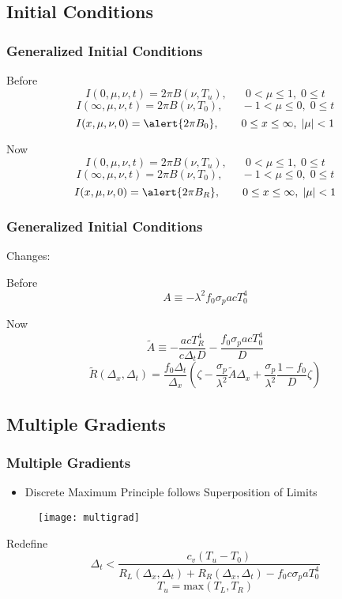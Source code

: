\documentclass{beamer}
\begin{document}
\subsection{Initial Conditions}
\begin{frame}\frametitle{Generalized Initial Conditions}
\begin{block}{Before}
\[I(0,\mu,\nu,t)=2\pi B(\nu,T_u),\hspace{20pt}0<\mu\leq1,\; 0\leq t\]
\[I(\infty,\mu,\nu,t)=2\pi B(\nu,T_0),\hspace{20pt}-1<\mu\leq0,\; 0\leq t\]
\[I(x,\mu,\nu,0)=\alert{2\pi B_0}, \hspace{20pt}0\leq x\leq\infty,\; |\mu|<1\]
\end{block}\pause\transsplitverticalout
\begin{block}{Now}
\[I(0,\mu,\nu,t)=2\pi B(\nu,T_u),\hspace{20pt}0<\mu\leq1,\; 0\leq t\]
\[I(\infty,\mu,\nu,t)=2\pi B(\nu,T_0),\hspace{20pt}-1<\mu\leq0,\; 0\leq t\]
\[I(x,\mu,\nu,0)=\alert{2\pi B_R}, \hspace{20pt}0\leq x\leq\infty,\; |\mu|<1\]
\end{block}
\end{frame}

\begin{frame}\frametitle{Generalized Initial Conditions}
Changes:
\begin{block}{Before}
\[A\equiv-\lambda^2f_0\sigma_pacT_0^4\]
\end{block}
\begin{block}{Now}
\[\tilde A\equiv-\frac{acT_R^4}{c\Delta_tD}-\frac{f_0\sigma_pacT_0^4}{D}\]
\[\tilde R(\Delta_x,\Delta_t)=
\frac{f_0\Delta_t}{\Delta_x}\left(
  \zeta - \frac{\sigma_p}{\lambda^2} \tilde A\Delta_x
  + \frac{\sigma_p}{\lambda^2}\frac{1-f_0}{D}\zeta\right)\]
\end{block}
\end{frame}
\subsection{Multiple Gradients}
\begin{frame}\frametitle{Multiple Gradients}
\begin{itemize}
 \item Discrete Maximum Principle follows Superposition of Limits
\end{itemize}
\begin{figure}
\texttt{[image: multigrad]}
\end{figure}
\pause\transsplitverticalout
\begin{exampleblock}{Redefine}
\[\Delta_t < \frac{c_v(T_u-T_0)}{R_L(\Delta_x,\Delta_t)+R_R(\Delta_x,\Delta_t) -
f_0c\sigma_p aT_0^4}\]
\[T_u = \mbox{max}(T_L,T_R)\]
\end{exampleblock}
\end{frame}
\end{document}
